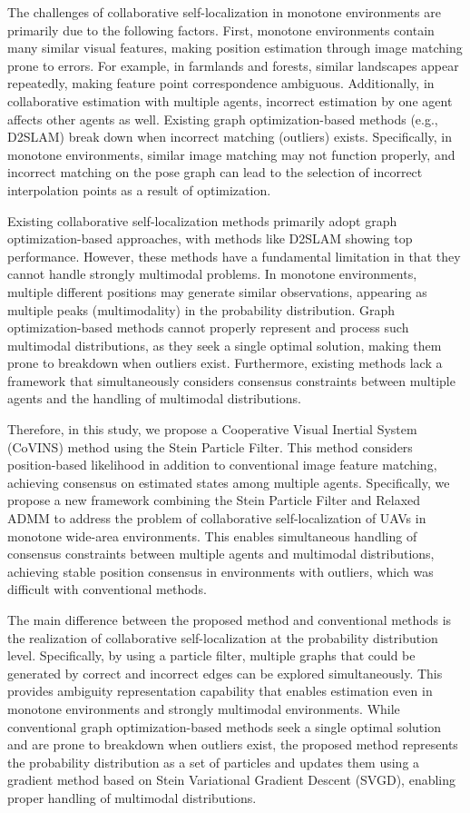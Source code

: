 \documentclass[a4paper,fleqn,10pt,twocolumn]{SICE_ISCS}
\begin{document}
The challenges of collaborative self-localization in monotone environments are primarily due to the following factors. First, monotone environments contain many similar visual features, making position estimation through image matching prone to errors. For example, in farmlands and forests, similar landscapes appear repeatedly, making feature point correspondence ambiguous. Additionally, in collaborative estimation with multiple agents, incorrect estimation by one agent affects other agents as well. Existing graph optimization-based methods (e.g., D2SLAM) break down when incorrect matching (outliers) exists. Specifically, in monotone environments, similar image matching may not function properly, and incorrect matching on the pose graph can lead to the selection of incorrect interpolation points as a result of optimization.

Existing collaborative self-localization methods primarily adopt graph optimization-based approaches, with methods like D2SLAM showing top performance. However, these methods have a fundamental limitation in that they cannot handle strongly multimodal problems. In monotone environments, multiple different positions may generate similar observations, appearing as multiple peaks (multimodality) in the probability distribution. Graph optimization-based methods cannot properly represent and process such multimodal distributions, as they seek a single optimal solution, making them prone to breakdown when outliers exist. Furthermore, existing methods lack a framework that simultaneously considers consensus constraints between multiple agents and the handling of multimodal distributions.

Therefore, in this study, we propose a Cooperative Visual Inertial System (CoVINS) method using the Stein Particle Filter. This method considers position-based likelihood in addition to conventional image feature matching, achieving consensus on estimated states among multiple agents. Specifically, we propose a new framework combining the Stein Particle Filter and Relaxed ADMM to address the problem of collaborative self-localization of UAVs in monotone wide-area environments. This enables simultaneous handling of consensus constraints between multiple agents and multimodal distributions, achieving stable position consensus in environments with outliers, which was difficult with conventional methods.

The main difference between the proposed method and conventional methods is the realization of collaborative self-localization at the probability distribution level. Specifically, by using a particle filter, multiple graphs that could be generated by correct and incorrect edges can be explored simultaneously. This provides ambiguity representation capability that enables estimation even in monotone environments and strongly multimodal environments. While conventional graph optimization-based methods seek a single optimal solution and are prone to breakdown when outliers exist, the proposed method represents the probability distribution as a set of particles and updates them using a gradient method based on Stein Variational Gradient Descent (SVGD), enabling proper handling of multimodal distributions.
\end{document}
